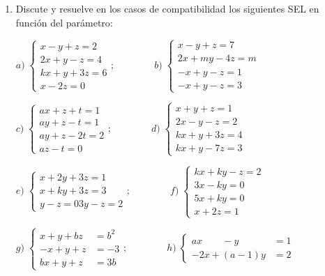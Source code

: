 \begin{enumerate}


\item Discute y resuelve en los casos de compatibilidad los siguientes SEL en función del parámetro:
 
 $a)\; \begin{cases} x-y+z=2\\2x+y-z=4\\kx+y+3z=6\\x-2z=0  \end{cases}; \qquad \qquad b)\; \begin{cases}    x-y+z=7\\2x+my-4z=m\\
 -x+y-z=1\\-x+y-z=3 \end{cases}$
 
 $c)\; \begin{cases}  ax+z+t=1\\ay+z-t=1\\ay+z-2t=2\\az-t=0  \end{cases}; \qquad \qquad d)\; \begin{cases}  x+y+z=1\\2x-y-z=2\\kx+y+3z=4\\kx+y-7z=3  \end{cases}$
  
 $e)\; \begin{cases}  x+2y+3z=1\\x+ky+3z=3\\y-z=03y-z=2  \end{cases}; \qquad \qquad f)\; \begin{cases}  kx+ky-z=2\\3x-ky=0\\5x+ky=0\\x+2z=1  \end{cases}$
   
$g)\; \begin{cases} x+y+bz&=b^2\\-x+y+z&=-3\\bx+y+z&=3b   \end{cases}; \qquad \qquad h)\; \begin{cases}  ax \qquad -y &=1\\ -2x+(a-1)y&=2  \end{cases}$
 

\end{enumerate}
